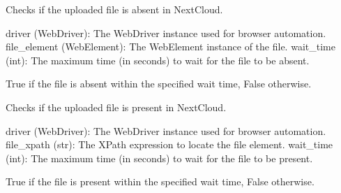 \documentclass[letterpaper,10pt,english]{sphinxmanual}
\begin{document}

\begin{fulllineitems}
\label{\detokenize{utils:utils.file_management.check_file_deletion}}
\pysigstartsignatures
{}
\pysigstopsignatures
\sphinxAtStartPar
Checks if the uploaded file is absent in NextCloud.
\begin{description}
\sphinxAtStartPar
driver (WebDriver): The WebDriver instance used for browser automation.
file\_element (WebElement): The WebElement instance of the file.
wait\_time (int): The maximum time (in seconds) to wait for the file to be absent.

\sphinxAtStartPar
True if the file is absent within the specified wait time, False otherwise.

\end{description}

\end{fulllineitems}


\begin{fulllineitems}
\label{\detokenize{utils:utils.file_management.check_file_presence}}
\pysigstartsignatures
{}
\pysigstopsignatures
\sphinxAtStartPar
Checks if the uploaded file is present in NextCloud.
\begin{description}
\sphinxAtStartPar
driver (WebDriver): The WebDriver instance used for browser automation.
file\_xpath (str): The XPath expression to locate the file element.
wait\_time (int): The maximum time (in seconds) to wait for the file to be present.

\sphinxAtStartPar
True if the file is present within the specified wait time, False otherwise.

\end{description}

\end{fulllineitems}
\end{document}
